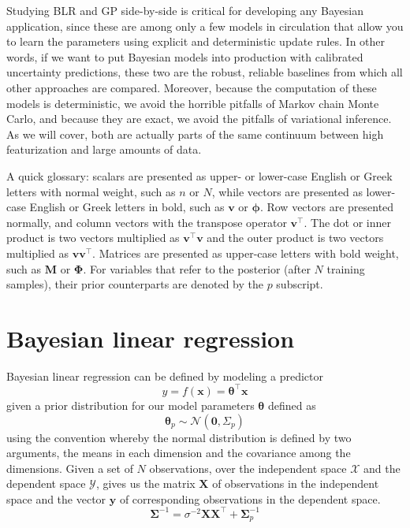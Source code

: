 \documentclass{article}
\begin{document}
Studying BLR and GP side-by-side is critical for developing any Bayesian application, since these are among only a few models in  circulation that allow you to learn the parameters using explicit and deterministic update rules. In other words, if we want to put Bayesian models into production with calibrated uncertainty predictions, these two are the robust, reliable baselines from which all other approaches are compared. Moreover, because the computation of these models is deterministic, we avoid the horrible pitfalls of Markov chain Monte Carlo, and because they are exact, we avoid the pitfalls of variational inference. As we will cover, both are actually parts of the same continuum between high featurization and large amounts of data. 

A quick glossary: scalars are presented as upper- or lower-case English or Greek letters with normal weight, such as $n$ or $N$, while vectors are presented as lower-case English or Greek letters in bold, such as $\mathbf{v}$ or $\boldsymbol{\phi}$. Row vectors are presented normally, and column vectors with the transpose operator $\mathbf{v}^\top$. The dot or inner product is two vectors multiplied as $\mathbf{v}^\top \mathbf{v}$ and the outer product is two vectors multiplied as $\mathbf{v} \mathbf{v}^\top$. Matrices are presented as upper-case letters with bold weight, such as $\mathbf{M}$ or $\boldsymbol{\Phi}$. For variables that refer to the posterior (after $N$ training samples), their prior counterparts are denoted by the $p$ subscript.

\section{Bayesian linear regression}

Bayesian linear regression can be defined by modeling a predictor
\begin{equation}
    y=f(\mathbf{x})=\boldsymbol{\theta}^\top\mathbf{x}
\end{equation} 
given a prior distribution for our model parameters $\boldsymbol{\theta}$ defined as 
\begin{equation}
    \boldsymbol{\theta}_p \sim \mathcal{N}(\mathbf{0},\Sigma_p)
\end{equation} 
using the convention whereby the normal distribution is defined by two arguments, the means in each dimension and the covariance among the dimensions. Given a set of $N$ observations, over the independent space $\mathcal{X}$ and the dependent space $\mathcal{Y}$, gives us the matrix $\mathbf{X}$ of observations in the independent space and the vector $\mathbf{y}$ of corresponding observations in the dependent space.
\begin{equation}
    \boldsymbol{\Sigma}^{-1} = \sigma^{-2}\mathbf{XX}^\top + \boldsymbol{\Sigma}_p^{-1}
\end{equation}
\end{document}
